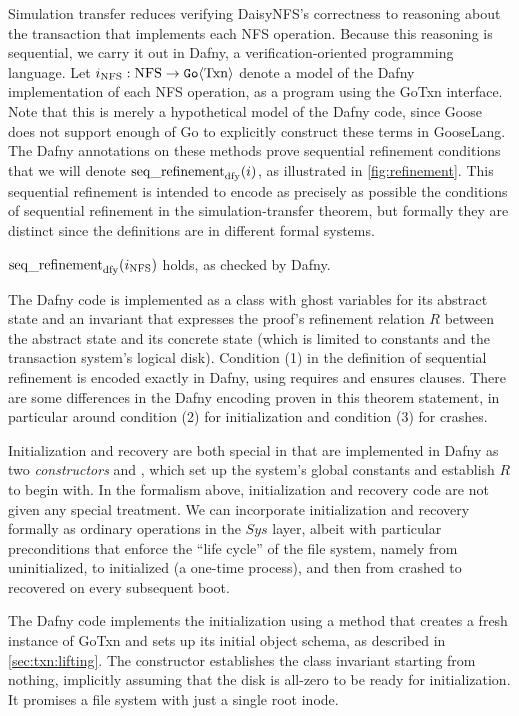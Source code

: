 \newlength{\stepw}
\newlength{\dstepw}
\newlength{\nfstop}

Simulation transfer reduces verifying DaisyNFS's correctness to reasoning about
the transaction that implements each NFS operation. Because this reasoning is
sequential, we carry it out in Dafny, a verification-oriented programming language.
Let $i_{\mathrm{NFS}} : \mathrm{NFS} \to \mathtt{Go}\langle \mathrm{Txn} \rangle$ denote a model of the
Dafny implementation of each NFS operation, as a program using the GoTxn
interface. Note that this is merely a hypothetical model of the Dafny code,
since Goose does not support enough of Go to explicitly construct these terms in
GooseLang. The Dafny annotations on these methods prove sequential refinement
conditions that we will denote $\operatorname{seq\_refinement}_{\mathrm{dfy}}(i)$, as
illustrated in \cref{fig:refinement}. This sequential refinement is intended to
encode as precisely as possible the conditions of sequential refinement in the
simulation-transfer theorem, but formally they are distinct since the
definitions are in different formal systems.

\begin{theorem} $\operatorname{seq\_refinement}_{\mathrm{dfy}}(i_{\mathrm{NFS}})$ holds, as checked by Dafny.
  \label{thm:dafny}
\end{theorem}

The Dafny code is implemented as a class with ghost variables for its abstract
state and an invariant that expresses the proof's refinement relation $R$
between the abstract state and its concrete state (which is limited to constants
and the transaction system's logical disk). Condition (1) in the definition of
sequential refinement is encoded exactly in Dafny, using requires and ensures
clauses. There are some differences in the Dafny encoding proven in this theorem statement,
in particular around condition (2) for initialization and condition (3) for
crashes.

Initialization and recovery are both special in that are implemented in Dafny as
two \emph{constructors}  and , which set up the system's
global constants and establish $R$ to begin with. In the formalism above,
initialization and recovery code are not given any special treatment. We can
incorporate initialization and recovery formally as ordinary operations in the
$\mathit{Sys}$ layer, albeit with particular preconditions that enforce the
``life cycle'' of the file system, namely from uninitialized, to initialized (a
one-time process), and then from crashed to recovered on every subsequent boot.

The Dafny code implements the initialization using a  method
that creates a fresh instance of GoTxn and sets up its initial object schema, as
described in \cref{sec:txn:lifting}. The  constructor establishes the
class invariant  starting from nothing, implicitly assuming that the
disk is all-zero to be ready for initialization. It promises a file
system with just a single root inode.

